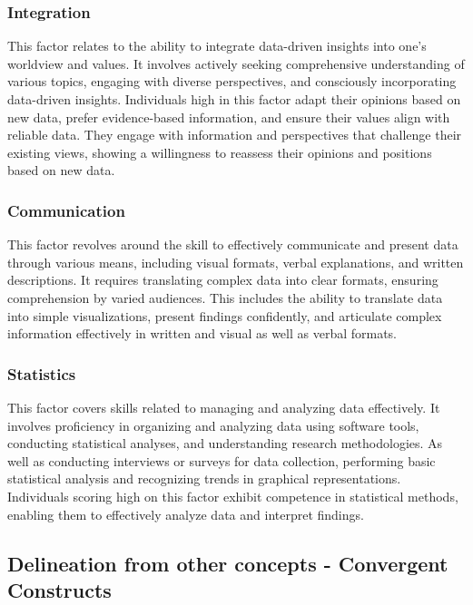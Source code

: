 \documentclass[
  12pt,
  a4paper,
  twoside]{article}
\begin{document}
\subsubsection{Integration}\label{integration}

This factor relates to the ability to integrate data-driven insights
into one's worldview and values. It involves actively seeking
comprehensive understanding of various topics, engaging with diverse
perspectives, and consciously incorporating data-driven insights.
Individuals high in this factor adapt their opinions based on new data,
prefer evidence-based information, and ensure their values align with
reliable data. They engage with information and perspectives that
challenge their existing views, showing a willingness to reassess their
opinions and positions based on new data.

\subsubsection{Communication}\label{communication}

This factor revolves around the skill to effectively communicate and
present data through various means, including visual formats, verbal
explanations, and written descriptions. It requires translating complex
data into clear formats, ensuring comprehension by varied audiences.
This includes the ability to translate data into simple visualizations,
present findings confidently, and articulate complex information
effectively in written and visual as well as verbal formats.

\subsubsection{Statistics}\label{statistics}

This factor covers skills related to managing and analyzing data
effectively. It involves proficiency in organizing and analyzing data
using software tools, conducting statistical analyses, and understanding
research methodologies. As well as conducting interviews or surveys for
data collection, performing basic statistical analysis and recognizing
trends in graphical representations. Individuals scoring high on this
factor exhibit competence in statistical methods, enabling them to
effectively analyze data and interpret findings.

\subsection{Delineation from other concepts - Convergent
Constructs}\label{delineation-from-other-concepts---convergent-constructs}
\end{document}
